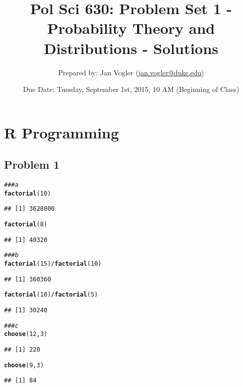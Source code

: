\documentclass[12pt,letter]{article}\usepackage[]{graphicx}\usepackage[]{color}
\makeatletter
\newcommand{\hlnum}[1]{\textcolor[rgb]{0.686,0.059,0.569}{#1}}%
\newcommand{\hlcom}[1]{\textcolor[rgb]{0.678,0.584,0.686}{\textit{#1}}}%
\newcommand{\hlopt}[1]{\textcolor[rgb]{0,0,0}{#1}}%
\newcommand{\hlstd}[1]{\textcolor[rgb]{0.345,0.345,0.345}{#1}}%
\newcommand{\hlkwd}[1]{\textcolor[rgb]{0.737,0.353,0.396}{\textbf{#1}}}%
\newenvironment{kframe}{%
 \def\at@end@of@kframe{}%
 \ifinner\ifhmode%
  \def\at@end@of@kframe{\end{minipage}}%
  \begin{minipage}{\columnwidth}%
 \fi\fi%
 \def\FrameCommand##1{\hskip\@totalleftmargin \hskip-\fboxsep
 \colorbox{shadecolor}{##1}\hskip-\fboxsep
     \hskip-\linewidth \hskip-\@totalleftmargin \hskip\columnwidth}%
 \MakeFramed {\advance\hsize-\width
   \@totalleftmargin\z@ \linewidth\hsize
   \@setminipage}}%
 {\par\unskip\endMakeFramed%
 \at@end@of@kframe}
\newenvironment{knitrout}{}{} %
\makeatother
\begin{document}
\title{Pol Sci 630: Problem Set 1 - Probability Theory and Distributions - Solutions}

\author{Prepared by: Jan Vogler (\href{mailto:jan.vogler@duke.edu}{jan.vogler@duke.edu})}

\date{Due Date: Tuesday, September 1st, 2015, 10 AM (Beginning of Class)}
 
\maketitle 



\section*{R Programming}

\subsection*{Problem 1}

\begin{knitrout}
\color{fgcolor}\begin{kframe}
\begin{alltt}
\hlcom{### a}
\hlkwd{factorial}\hlstd{(}\hlnum{10}\hlstd{)}
\end{alltt}
\begin{verbatim}
## [1] 3628800
\end{verbatim}
\begin{alltt}
\hlkwd{factorial}\hlstd{(}\hlnum{8}\hlstd{)}
\end{alltt}
\begin{verbatim}
## [1] 40320
\end{verbatim}
\begin{alltt}
\hlcom{### b}
\hlkwd{factorial}\hlstd{(}\hlnum{15}\hlstd{)}\hlopt{/}\hlkwd{factorial}\hlstd{(}\hlnum{10}\hlstd{)}
\end{alltt}
\begin{verbatim}
## [1] 360360
\end{verbatim}
\begin{alltt}
\hlkwd{factorial}\hlstd{(}\hlnum{10}\hlstd{)}\hlopt{/}\hlkwd{factorial}\hlstd{(}\hlnum{5}\hlstd{)}
\end{alltt}
\begin{verbatim}
## [1] 30240
\end{verbatim}
\begin{alltt}
\hlcom{### c}
\hlkwd{choose}\hlstd{(}\hlnum{12}\hlstd{,} \hlnum{3}\hlstd{)}
\end{alltt}
\begin{verbatim}
## [1] 220
\end{verbatim}
\begin{alltt}
\hlkwd{choose}\hlstd{(}\hlnum{9}\hlstd{,} \hlnum{3}\hlstd{)}
\end{alltt}
\begin{verbatim}
## [1] 84
\end{verbatim}
\end{kframe}
\end{knitrout}
\end{document}
